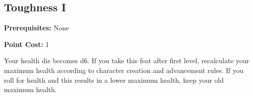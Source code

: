 \subsection*{Toughness I}\label{feat:toughness1}

\noindent
\textbf{Prerequisites:} None

\noindent
\textbf{Point Cost:} 1 

Your health die becomes d6. If you take this feat after first level,
recalculate your maximum health according to character creation and advancement
rules. If you roll for health and this results in a lower maximum health, keep
your old maximum health.
